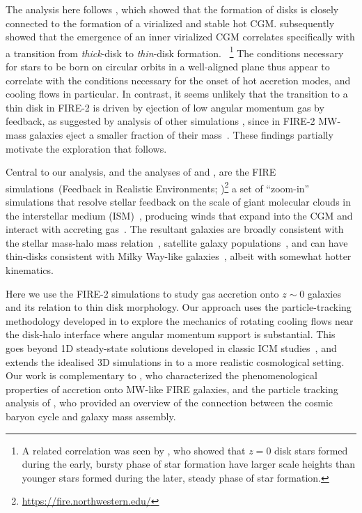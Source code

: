 \documentclass[fleqn,usenatbib]{mnras}
\begin{document}
The analysis here follows \cite{Stern2021}, which showed that the formation of disks is closely connected to the formation of a virialized and stable hot CGM.
\cite{Yu2021} subsequently showed that the emergence of an inner virialized CGM correlates specifically with a transition from {\em thick}-disk to {\em thin}-disk formation.
~\footnote{A related correlation was seen by \citealt{Ma2017a}, who showed that $z=0$ disk stars formed during the early, bursty phase of star formation have larger scale heights than younger stars formed during the later, steady phase of star formation.}
The conditions necessary for stars to be born on circular orbits in a well-aligned plane thus appear to correlate with the conditions necessary for the onset of hot accretion modes, and cooling flows in particular.
In contrast, it seems unlikely that the transition to a thin disk in FIRE-2 is driven by ejection of low angular momentum gas by feedback, as suggested by analysis of other simulations \citep[e.g.][]{Brook2011, Ubler2014, Genel2015, DeFelippis2017}, since in FIRE-2 MW-mass galaxies eject a smaller fraction of their mass~\citep[e.g.][]{Hafen2020,Pandya2021,Stern2021a}.
These findings partially motivate the exploration that follows.

Central to our analysis, and the analyses of \citeauthor{Stern2021} and \citeauthor{Yu2021}, are the FIRE simulations~(Feedback in Realistic Environments; \citealt{Hopkins2014, Hopkins2018})\footnote{\url{https://fire.northwestern.edu/}} a set of ``zoom-in'' simulations that resolve stellar feedback on the scale of giant molecular clouds in the interstellar medium (ISM)~\citep{Guszejnov2020b, Benincasa2020}, producing winds that expand into the CGM and interact with accreting gas~\citep{Muratov2015, Muratov2017, Angles-Alcazar2017, Hafen2019, Hafen2020, Pandya2021}.
The resultant galaxies are broadly consistent with the stellar mass-halo mass relation~\citep{Hopkins2017}, satellite galaxy populations~\citep{Wetzel2016, Garrison-Kimmel2019a, Samuel2020}, and can have thin-disks consistent with Milky Way-like galaxies~\citep{Ma2017a, Garrison-Kimmel2018, El-Badry2018, Yu2021}, albeit with somewhat hotter kinematics\citep{Sanderson2020}. 

Here we use the FIRE-2 simulations to study gas accretion onto $z\sim0$ galaxies and its relation to thin disk morphology.
Our approach uses the particle-tracking methodology developed in \citet{Hafen2019, Hafen2020} to explore the mechanics of rotating cooling flows near the disk-halo interface where angular momentum support is substantial.
This goes beyond 1D steady-state solutions developed in classic ICM studies~\citep[e.g.][]{Cowie1980}, and extends the idealised 3D simulations in \cite{Stern2020} to a more realistic cosmological setting. 
Our work is complementary to \citet{Trapp2021}, who characterized the phenomenological properties of accretion onto MW-like FIRE galaxies, and the particle tracking analysis of \cite{Angles-Alcazar2017}, who provided an overview of the connection between the cosmic baryon cycle and galaxy mass assembly. 
\end{document}
